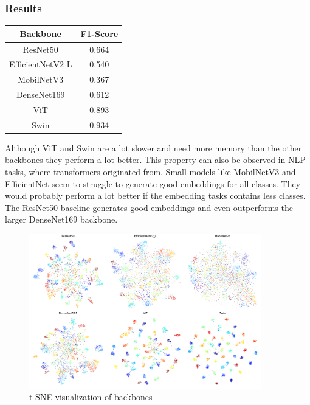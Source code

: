 \documentclass[12pt,a4paper]{report}
\begin{document}
\subsubsection*{Results}
\begin{table}
	\begin{tabular}{ | c | c | }
		\hline
		Backbone & F1-Score \\ 
		\hline
		ResNet50 & 0.664 \\ 
		\hline
		EfficientNetV2 L & 0.540 \\ 
		\hline
		MobilNetV3 & 0.367 \\ 
		\hline
		DenseNet169 & 0.612 \\ 
		\hline
		ViT & 0.893 \\ 
		\hline
		Swin & 0.934 \\ 
		\hline
	\end{tabular}
\end{table} 
Although ViT and Swin are a lot slower and need more memory than the other backbones they perform a lot better.
This property can also be observed in NLP tasks, where transformers originated from.
Small models like MobilNetV3 and EfficientNet seem to struggle to generate good embeddings for all classes.
They would probably perform a lot better if the embedding tasks contains less classes.
The ResNet50 baseline generates good embeddings and even outperforms the larger DenseNet169 backbone.

\vspace{0.5cm}

\begin{figure}[h]
	\centering
	\includegraphics[width=0.9\textwidth]{../plots/backbones.png}
	\caption{t-SNE visualization of backbones}
\end{figure}
\end{document}
